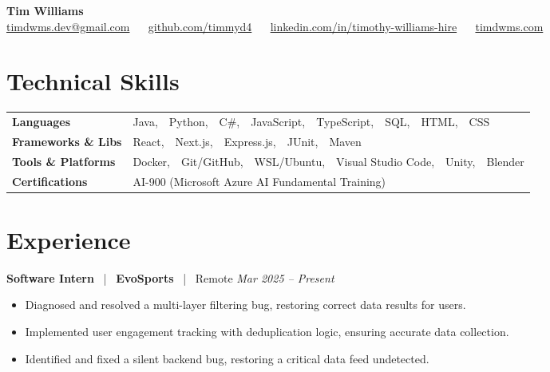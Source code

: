 \documentclass[10pt, letterpaper]{article}
\newcommand{\jobhead}[4]{%
  \vspace{5pt}%
  {\bfseries\color{dark}#1}%
  ~{\color{light}|}~%
  {\bfseries\color{navy}#2}%
  ~{\color{light}|}~%
  {\color{light}#3}%
  \hfill{\color{light}\small\textit{#4}}\\[-2pt]%
}
\newcommand{\skillrow}[2]{%
  {\bfseries #1} & #2 \\[2pt]%
}
\begin{document}

\begin{center}
  {\huge\bfseries\color{navy} Tim Williams}\\[4pt]
  {\small\color{light}
    \href{mailto:timdwms.dev@gmail.com}{timdwms.dev@gmail.com}
    ~\textbullet~
    \href{https://github.com/timmyd4}{github.com/timmyd4}
    ~\textbullet~
    \href{https://www.linkedin.com/in/timothy-williams-hire}{linkedin.com/in/timothy-williams-hire}
    ~\textbullet~
    \href{https://timdwms.com}{timdwms.com}
  }
\end{center}

\vspace{2pt}

\section{Technical Skills}

\begin{tabular}{@{}p{1.6in} p{5.2in}@{}}
  \skillrow{Languages}{Java,\ \ Python,\ \ C\#,\ \ JavaScript,\ \ TypeScript,\ \ SQL,\ \ HTML,\ \ CSS}
  \skillrow{Frameworks \& Libs}{React,\ \ Next.js,\ \ Express.js,\ \ JUnit,\ \ Maven}
  \skillrow{Tools \& Platforms}{Docker,\ \ Git/GitHub,\ \ WSL/Ubuntu,\ \ Visual Studio Code,\ \ Unity,\ \ Blender}
  \skillrow{Certifications}{AI-900 (Microsoft Azure AI Fundamental Training)}
\end{tabular}

\section{Experience}

\jobhead{Software Intern}{EvoSports}{Remote}{Mar 2025 – Present}
\begin{itemize}
  \item Diagnosed and resolved a multi-layer filtering bug, restoring correct data results for users.
  \item Implemented user engagement tracking with deduplication logic, ensuring accurate data collection.
  \item Identified and fixed a silent backend bug, restoring a critical data feed undetected.
\end{itemize}
\end{document}
